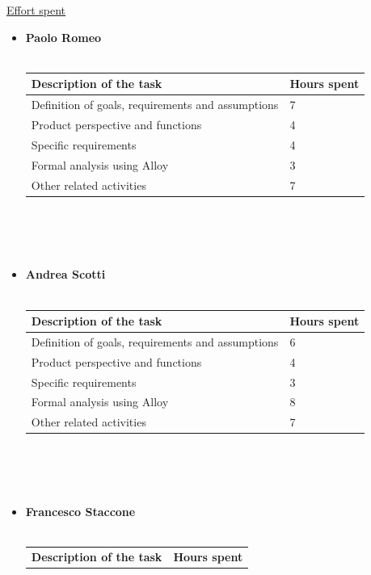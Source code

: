 \documentclass{article}
\begin{document}
\begin{legal}
	\newpage
	\item \underline{Effort spent}\\
		{\normalfont
		\begin{itemize}
		\item \textbf{Paolo Romeo}\\\\
				\begin{tabular}{| m{9cm} | m{3cm}| }
				\hline
					\textbf{Description of the task} & \textbf{Hours spent}\\
				\hline
					Definition of goals, requirements and assumptions & 7 \\
				\hline
					Product perspective and functions & 4 \\
				\hline
					Specific requirements & 4 \\
				\hline
					Formal analysis using Alloy & 3 \\
				\hline
					Other related activities & 7 \\
				\hline
				\end{tabular}
				\\\\\\
		\item \textbf{Andrea Scotti}\\\\
				\begin{tabular}{| m{9cm} | m{3cm}| }
				\hline
					\textbf{Description of the task} & \textbf{Hours spent}\\
				\hline
					Definition of goals, requirements and assumptions & 6 \\
				\hline
					Product perspective and functions & 4 \\
				\hline
					Specific requirements & 3 \\
				\hline
					Formal analysis using Alloy & 8 \\
				\hline
					Other related activities & 7 \\
				\hline
				\end{tabular}
				\\\\\\
		\item \textbf{Francesco Staccone}\\\\
				\begin{tabular}{| m{9cm} | m{3cm}| }
				\hline
					\textbf{Description of the task} & \textbf{Hours spent}\\

\end{tabular}
\end{itemize}}
\end{legal}
\end{document}
